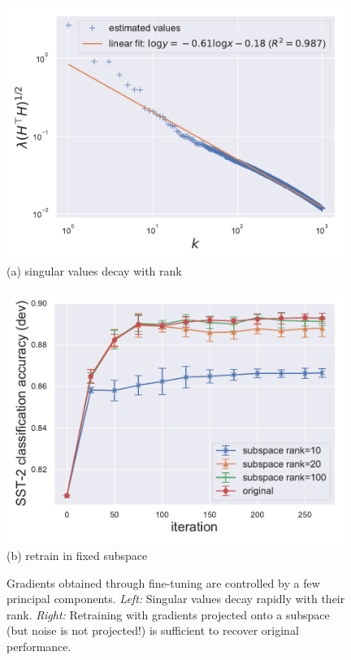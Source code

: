 \begin{figure}[thb]
\begin{center}
\begin{minipage}[t]{0.48\linewidth}
\centering
{\includegraphics[width=0.98\textwidth]{figs/privlm/roberta/eigenvalue-linfit.pdf}}
\footnotesize{(a) singular values decay with rank}
\end{minipage}
\begin{minipage}[t]{0.48\linewidth}
\centering
{\includegraphics[width=0.98\textwidth]{figs/privlm/roberta/plot2.pdf}}
\footnotesize{(b) retrain in fixed subspace}
\end{minipage}
\end{center}
\caption{
Gradients obtained through fine-tuning are controlled by a few principal components.
\emph{Left:} Singular values decay rapidly with their rank.
\emph{Right:} Retraining with gradients projected onto a subspace (but noise is not projected!) is sufficient to recover original performance.
}
\label{fig:pca}
\end{figure}


